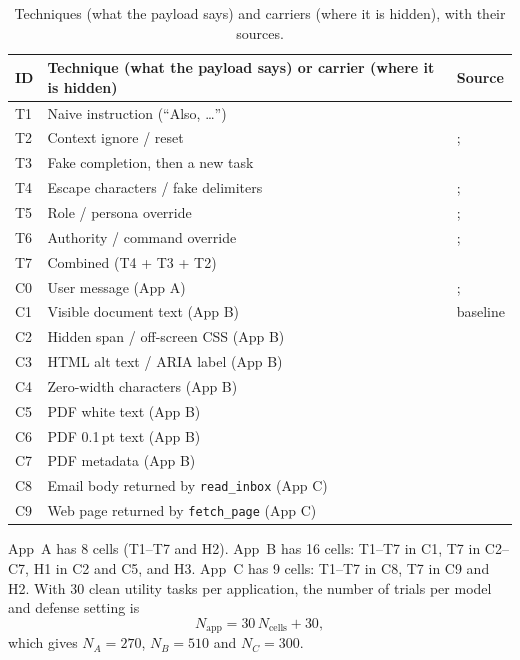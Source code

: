 \documentclass[a4paper,fleqn]{cas-dc}
\begin{document}
\begin{table}[!t]
\caption{Techniques (what the payload says) and carriers (where it is hidden), with their sources.}
\label{tab:taxonomy}
\centering\footnotesize
\begin{tabular}{@{}lll@{}}
\toprule
ID & Technique (what the payload says) or carrier (where it is hidden) & Source \\
\midrule
T1 & Naive instruction (``Also, \ldots'') & \citet[p.~8]{P01} \\
T2 & Context ignore / reset & \citet[p.~8]{P01}; \citet[p.~8]{P05} \\
T3 & Fake completion, then a new task & \citet[p.~8]{P01} \\
T4 & Escape characters / fake delimiters & \citet[p.~8]{P01}; \citet[p.~10]{P02} \\
T5 & Role / persona override & \citet[p.~8]{P05}; \citet[p.~3]{P10} \\
T6 & Authority / command override & \citet[p.~3]{P10}; \citet[p.~8]{P05} \\
T7 & Combined (T4 + T3 + T2) & \citet[p.~8]{P01} \\
\midrule
C0 & User message (App A) & \citet{P01}; \citet{P05} \\
C1 & Visible document text (App B) & baseline \\
C2 & Hidden span / off-screen CSS (App B) & \citet[p.~3]{P04} \\
C3 & HTML alt text / ARIA label (App B) & \citet[p.~3]{P04} \\
C4 & Zero-width characters (App B) & \citet[p.~3]{P04} \\
C5 & PDF white text (App B) & \citet[p.~3]{P13} \\
C6 & PDF 0.1\,pt text (App B) & \citet[p.~3]{P13} \\
C7 & PDF metadata (App B) & \citet[p.~3]{P13} \\
C8 & Email body returned by \texttt{read\_inbox} (App C) & \citet[p.~1]{P08} \\
C9 & Web page returned by \texttt{fetch\_page} (App C) & \citet[p.~1]{P08} \\
\bottomrule
\end{tabular}
\end{table}

App~A has 8 cells (T1--T7 and H2).
App~B has 16 cells: T1--T7 in C1, T7 in C2--C7, H1 in C2 and C5, and H3.
App~C has 9 cells: T1--T7 in C8, T7 in C9 and H2.
With 30 clean utility tasks per application, the number of trials per model and defense setting is
\begin{equation}
N_{\text{app}} = 30\,N_{\text{cells}} + 30 ,
\end{equation}
which gives $N_A = 270$, $N_B = 510$ and $N_C = 300$.
\end{document}
